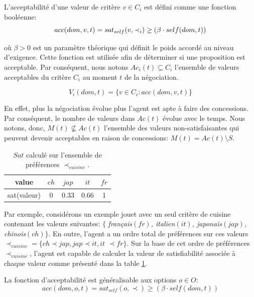 	L'acceptabilité d'une valeur de critère $v \in C_i$ est défini comme une fonction booléenne:
	\begin{equation}
	\vspace{0.5em}
	acc(dom,v, t) = sat_{self}(v, \prec_i) \geq  (\beta \cdot self(dom,t))
	\end{equation}
	
	\medskip
	où $\beta>0$ est un paramètre théorique qui définit le poids accordé au niveau d'exigence. Cette fonction est utilisée afin de déterminer si une proposition est acceptable. Par conséquent, nous notons $Ac_i(t) \subseteq C_i $ l'ensemble de valeurs acceptables du critère $C_i$ au moment $t$ de la négociation. 
	
	\begin{equation}
	V_i(dom,t) = \{ v\in C_i : acc(dom,v,t) \}
	\end{equation}
	
	En effet, plus la négociation évolue plus l'agent est apte à faire des concessions. Par conséquent, le nombre de valeurs dans $Ac(t)$ évolue avec le temps. 	Nous notons, donc, $M(t) \not \subseteq Ac(t)$ l'ensemble des valeurs non-satisfaisantes qui peuvent devenir acceptables en raison de concessions: $M(t)=Ac(t)\setminus S$.
	
		\begin{table} [h]
		\centering
		\begin{tabular}{ |c|c|c|c|c| }
			\hline
			value & $ch$ & $jap$ & $it$ & $fr$ \\	
			\hline
			sat(valeur) & 0 & 0.33 & 0.66 & 1 \\
			\hline
		\end{tabular}
		\caption{$Sat$ calculé sur l'ensemble de préférences $\prec_{cuisine}$.}
		\label{tab:ch4sat}	
	\end{table}

	Par exemple, considérons un exemple jouet avec un seul critère de cuisine contenant les valeurs suivantes: 
	$\{$ \emph {français$ (fr)$, italien$ (it)$, japonais$ (jap)$, chinois$ (ch)$}$ \}$. En outre, l'agent a un ordre total de préférences sur ces valeurs$ \prec_ {cuisine}$$ = \{ch$$ \prec$$ jap, jap$$ \prec$$ it,  it$ $\prec$$ fr\}$. Sur la base de cet ordre de préférences $\prec_{cuisine}$, l'agent est capable de calculer la valeur de satisfiabilité associée à chaque valeur comme présenté dans la table \ref {tab:ch4sat}.
	
	
	
	La fonction d'acceptabilité est généralisable aux options $o \in O$:
	 $$acc(dom,o, t) = sat_{self}(o, \prec) \geq  (\beta \cdot self(dom,t))$$

